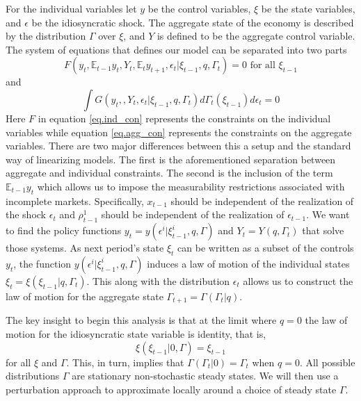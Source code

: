 \documentclass[thmsb,11pt]{article}
\newcommand{\EE}{\mathbb E}
\begin{document}
For the individual variables let $y$ be the control variables, $\xi$ be the  state variables, and  $\epsilon$ be the idiosyncratic shock.  The aggregate state of the economy is described by the distribution $\Gamma$ over $\xi$, and $Y$ is defined to be the aggregate control variable.  The system of equations that defines our model can be separated into two parts
\begin{equation}\label{eq.ind_con}
	F(y_t, \EE_{t-1} y_t, Y_t, \EE_t y_{t+1} ,\epsilon_t| \xi_{t-1},q,\Gamma_t) = 0  \text{  for all $\xi_{t-1}$}
\end{equation}and
\begin{equation}\label{eq.agg_con}
	\int G(y_t,,Y_t,\epsilon_t|\xi_{t-1},q,\Gamma_t) d\Gamma_t(\xi_{t-1})d\epsilon_t = 0
\end{equation}  Here $F$ in equation \eqref{eq.ind_con} represents the constraints on the individual variables while equation \eqref{eq.agg_con} represents the constraints on the aggregate variables.  There are two major differences between this a setup and the standard way of linearizing models.  The first is the aforementioned separation between aggregate and individual constraints.   The second is the inclusion of the term  $\EE_{t-1} y_t$ which allows us to impose the measurability restrictions associated with incomplete markets.  Specifically, $x_{t-1}$ should be independent of the realization of the shock $\epsilon_t$ and $\rho^1_{t-1}$ should be independent of the realization of $\epsilon_{t-1}$.  We want to find the policy functions $y_t= y(\epsilon^i| \xi^i_{t-1},q,\Gamma)$ and  $Y_t = Y(q,\Gamma_t)$ that solve those systems.  As next period's state $\xi_t$ can be written as a subset of the controls $y_t$, the function $y(\epsilon^i| \xi^i_{t-1},q,\Gamma)$ induces a law of motion of the individual 
states $\xi_t = \xi(\xi_{t-1}|q,\Gamma_t)$.  This along with the distribution $\epsilon_t$ allows us to construct the law of motion for the aggregate state $\Gamma_{t+1} = \Gamma(\Gamma_t | q)$.

The key insight to begin this analysis is that at the limit where $q = 0$ the law of motion for the idiosyncratic state variable is identity, that is,
\[
	\xi(\xi_{t-1}|0,\Gamma) = \xi_{t-1}
\] for all $\xi$ and $\Gamma$.  This, in turn, implies that $\Gamma(\Gamma_{t}|0) = \Gamma_{t}$ when $q=0$.  All possible distributions $\Gamma$ are stationary non-stochastic steady states.   We will then use a perturbation approach to approximate locally around a choice of steady state $\Gamma$.
\end{document}
